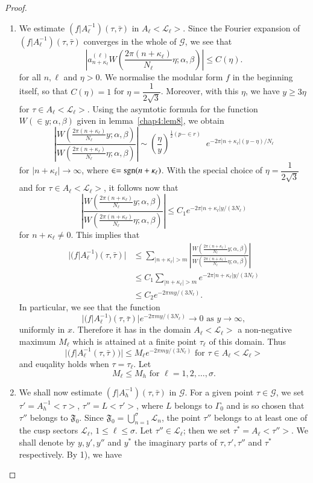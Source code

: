 \begin{proof}
\begin{enumerate}
\item We estimate $(f|A^{-1}_{\ell})(\tau,\bar{\tau})$ in
  $A_{\ell}<\mathscr{L}_{\ell}>$. Since the Fourier expansion of
  $(f|A^{-1}_{\ell})(\tau,\bar{\tau})$ converges in the whole of
  $\mathscr{G}$, we see that 
$$
|a^{(\ell)}_{n+\kappa_{\ell}} W(\frac{2\pi
  (n+\kappa_{\ell})}{N_{\ell}} \eta; \alpha, \beta)| \leq C(\eta).
$$
for all $n,\ell$ and $\eta>0$. We normalise the modular form $f$ in
the beginning itself, so that $C(\eta)=1$ for
$\eta=\dfrac{1}{2\sqrt{3}}$. Moreover, with this $\eta$, we have
$y\geq 3\eta$ for $\tau\in A_{\ell}
<\mathscr{L}_{\ell}>$. Using the asymtotic formula for the function
$W(\in y; \alpha, \beta)$ given in lemma~\ref{chap4:lem8}, we obtain
$$
\left|
\frac{W(\frac{2\pi(n+\kappa_{\ell})}{N_{\ell}}y;\alpha,\beta)}{W
  (\frac{2\pi(n+\kappa_{\ell})}{N_{\ell}}\eta;\alpha,\beta)} \right|
\sim (\frac{\eta}{y})^{\frac{1}{2}(p-\in r)} \;\; 
e^{-2\pi|n+\kappa_{\ell}|(y-\eta)/N_{\ell}}
$$
for $|n+\kappa_{\ell}|\to \infty$, where $\in
=\operatorname{sgn}(n+\kappa_{\ell})$. With the special choice of
$\eta=\dfrac{1}{2\sqrt{3}}$ and for $\tau \in A_{\ell}
<\mathscr{L}_{\ell}>$, it follows now that
$$
\left| 
\frac{W(\frac{2\pi(n+\kappa_{\ell})}{N_{\ell}}y;\alpha,\beta)}{W
(\frac{2\pi(n+\kappa_{\ell})}{N_{\ell}}\eta;\alpha,\beta)} \right|
\leq C_1 e^{-2\pi|n+\kappa_{\ell}|y/(3N_{\ell})}
$$
for $n+\kappa_{\ell} \neq 0$. This implies that
\begin{align*}
|(f|A^{-1}_{\ell})(\tau,\bar{\tau})| & \leq \sum_{|n+\kappa_{\ell}|>m} \left| 
\frac{W(\frac{2\pi(n+\kappa_{\ell})}{N_{\ell}}y;\alpha,\beta)}{W
  (\frac{2\pi(n+\kappa_{\ell})}{N_{\ell}}\eta;\alpha,\beta)} \right|\\
& \leq C_1 \sum_{|n+\kappa_{\ell}|>m} e^{-2\pi
  |n+\kappa_{\ell}|y/(3N_{\ell})}\\
& \leq C_2 e^{-2\pi m y /(3N_{\ell})}.
\end{align*}\pageoriginale
In particular, we see that the function
$$
|(f|A^{-1}_{\ell})(\tau,\bar{\tau})| e^{-2\pi my/(3N_{\ell})} \to 0
\text{ as } y \to \infty,
$$
uniformly in $x$. Therefore it has in the domain $A_{\ell}
<\mathscr{L}_{\ell}>$ a non-negative maximum $M_{\ell}$ which is
attained at a finite point $\tau_{\ell}$ of this domain. Thus
$$
|(f|A^{-1}_{\ell}(\tau,\bar{\tau}))| \leq M_{\ell} e^{-2\pi
my/(3N_{\ell})} \text{ for } \tau \in A_{\ell}
<\mathscr{L}_{\ell}> 
$$
and euqality holds when $\tau =\tau_{\ell}$. Let 
$$
M_{\ell} \leq M_h \text{ for } \ell=1,2, \ldots, \sigma.
$$

\item We shall now estimate $(f|A^{-1}_h)(\tau,\bar{\tau})$ in
  $\mathscr{G}$. For a given point $\tau \in \mathscr{G}$, we
  set $\tau'=A^{-1}_h<\tau>$, $\tau''=L<\tau'>$, where $L$ belongs to
  $\Gamma_0$ and is so chosen that $\tau''$ belongs to
  $\mathfrak{F}_0$. Since $\mathfrak{F}_0 =
  \bigcup^{\sigma}_{n=1}\mathscr{L}_n$, the point $\tau''$ belongs to
  at least one of the cusp sectors $\mathscr{L}_{\ell}$, $1\leq\ell
  \leq \sigma$. Let $\tau''\in \mathscr{L}_{\ell}$; then we
  set $\tau^{\ast}=A_{\ell}<\tau''>$. We shall denote by $y,y',y''$
  and $y^{\ast}$ the imaginary parts of $\tau,\tau',\tau''$ and
  $\tau^{\ast}$ respectively. By 1), we have 


\end{enumerate}
\end{proof}
